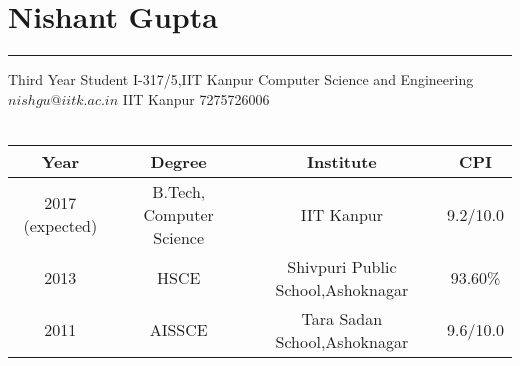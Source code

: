 \documentclass[a4paper]{article}
\author{Nishant Gupta}
\begin{document}

\section*{\textbf\Huge Nishant Gupta}
\hrule
\vspace{2mm}
Third Year Student  \hfill {I-317/5,IIT Kanpur} \newline
Computer Science and Engineering \hfill ${nishgu@iitk.ac.in}$ \newline
IIT Kanpur \hfill  {7275726006} \\ \\

\begin{center}
  \begin{tabular}{|c|c|c|c|} 
    \hline
    {\centering Year} & {\centering Degree} & {\centering Institute} & {\centering CPI} \\  
    \hline
    2017 (expected) & {B.Tech, Computer Science} & IIT Kanpur  & 9.2/10.0  \\ 
    2013 & HSCE & Shivpuri Public School,Ashoknagar & 			93.60\%	\\
    2011 & AISSCE & Tara Sadan School,Ashoknagar  & 9.6/10.0   \\
    \hline

  \end{tabular}
\end{center}
\end{document}
